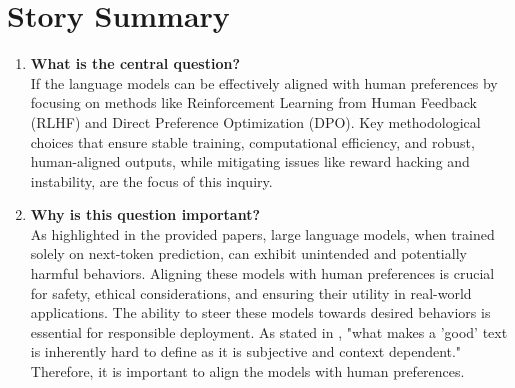 \documentclass[a4paper,oneside,10pt,ngerman,english]{scrartcl}
\begin{document}


\section{Story Summary}
\label{sec:storysummary}

\begin{enumerate}
    \item \textbf{What is the central question?} \\
    If the language models can be effectively aligned with human preferences by focusing on methods like Reinforcement Learning from Human Feedback (RLHF) and Direct Preference Optimization (DPO). Key methodological choices that ensure stable training, computational efficiency, and robust, human-aligned outputs, while mitigating issues like reward hacking and instability, are the focus of this inquiry.

    \item \textbf{Why is this question important?} \\
    As highlighted in the provided papers, large language models, when trained solely on next-token prediction, can exhibit unintended and potentially harmful behaviors. Aligning these models with human preferences is crucial for safety, ethical considerations, and ensuring their utility in real-world applications. The ability to steer these models towards desired behaviors is essential for responsible deployment. As stated in \cite{bib:lambert2022illustrating}, "what makes a 'good' text is inherently hard to define as it is subjective and context dependent." Therefore, it is important to align the models with human preferences.


\end{enumerate}
\end{document}

